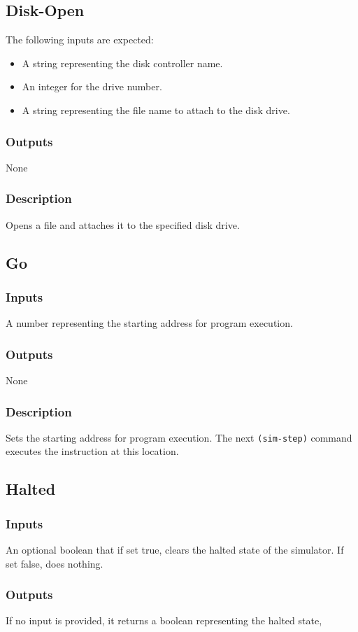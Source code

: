 \documentclass[10pt, openany]{book}
\begin{document}
\subsection{Disk-Open}
The following inputs are expected:
\begin{itemize}
  \item A string representing the disk controller name.
  \item An integer for the drive number.
  \item A string representing the file name to attach to the disk drive.
\end{itemize}
\subsubsection{Outputs}
None
\subsubsection{Description}
Opens a file and attaches it to the specified disk drive.

\subsection{Go}
\subsubsection{Inputs}
A number representing the starting address for program execution.
\subsubsection{Outputs}
None
\subsubsection{Description}
Sets the starting address for program execution.  The next \verb|(sim-step)| command executes the instruction at this location.

\subsection{Halted}
\subsubsection{Inputs}
An optional boolean that if set true, clears the halted state of the simulator.  If set false, does nothing.
\subsubsection{Outputs}
If no input is provided, it returns a boolean representing the halted state, 
\end{document}
